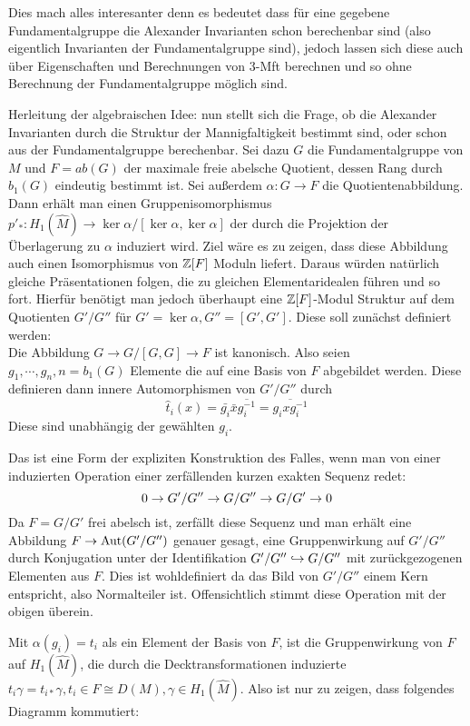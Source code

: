 Dies mach alles interesanter denn es bedeutet dass für eine gegebene Fundamentalgruppe die Alexander Invarianten schon berechenbar sind (also eigentlich Invarianten der Fundamentalgruppe sind), jedoch lassen sich diese auch über Eigenschaften und Berechnungen von 3-Mft berechnen und so ohne Berechnung der Fundamentalgruppe möglich sind. 


Herleitung der algebraischen Idee: nun stellt sich die Frage, ob die Alexander Invarianten durch die Struktur der Mannigfaltigkeit bestimmt sind, oder schon aus der Fundamentalgruppe berechenbar. Sei dazu $G$ die Fundamentalgruppe von $M$ und $F=ab(G)$ der maximale freie abelsche Quotient, dessen Rang durch $b_1(G)$ eindeutig bestimmt ist. Sei außerdem $\alpha:G\to F$ die Quotientenabbildung. Dann erhält man einen Gruppenisomorphismus $p'_*: H_1(\hat M) \to \ker\alpha/[\ker\alpha,\ker\alpha]$ der durch die Projektion der Überlagerung zu $\alpha$ induziert wird. Ziel wäre es zu zeigen, dass diese Abbildung auch einen Isomorphismus von $\mathbb{Z}[F]$ Moduln liefert. Daraus würden natürlich gleiche Präsentationen folgen, die zu gleichen Elementaridealen führen und so fort. Hierfür benötigt man jedoch überhaupt eine $\mathbb{Z}[F]$-Modul Struktur auf dem Quotienten $G'/G''$ für $G'=\ker\alpha, G''=[G',G']$. Diese soll zunächst definiert werden:\\
Die Abbildung $G \to G/[G,G] \to F$ ist kanonisch. Also seien $g_1,\cdots,g_n,n=b_1(G)$ Elemente die auf eine Basis von $F$ abgebildet werden. Diese definieren dann innere Automorphismen von $G'/G''$ durch 
\[
	\hat t_i(x) = \bar{ g_i} \bar{ x}\overline{ g_i^{-1}} = \overline{{} g_i x g_i^{-1}}
\]
Diese sind unabhängig der gewählten $g_i$. 
\begin{bem}
 	Das ist eine Form der expliziten Konstruktion des Falles, wenn man von einer induzierten Operation einer zerfällenden kurzen exakten Sequenz redet:
 	\[
 		0\to G'/G''\to G/G''\to G/G'\to0
 	\]
 	Da $F= G/G'$ frei abelsch ist, zerfällt diese Sequenz und man erhält eine Abbildung $F \to \operatorname{Aut}(G'/G'')$ genauer gesagt, eine Gruppenwirkung auf $G'/G''$ durch Konjugation unter der Identifikation $G'/G''\hookrightarrow G/G''$ mit zurückgezogenen Elementen aus $F$. Dies ist wohldefiniert da das Bild von $G'/G''$ einem Kern entspricht, also Normalteiler ist. Offensichtlich stimmt diese Operation mit der obigen überein.
 \end{bem} 
 Mit $\alpha(g_i)=t_i$ als ein Element der Basis von $F$, ist die Gruppenwirkung von $F$ auf $H_1(\hat M)$, die durch die Decktransformationen induzierte $t_i\gamma = t_{i*}\gamma,t_i \in F \cong D(M), \gamma \in H_1(\hat M)$. Also ist nur zu zeigen, dass folgendes Diagramm kommutiert:
